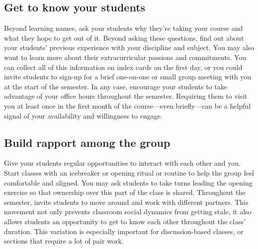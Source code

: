 \subsection{Get to know your students}
\label{sec:get-know-your}

Beyond learning names, ask your students why they’re taking your course and what they hope to get out of it. Beyond asking these questions, find out about your students’ previous experience with your discipline and subject. You may also want to learn more about their extracurricular passions and commitments. You can collect all of this information on index cards on the first day, or you could invite students to sign-up for a brief one-on-one or small group meeting with you at the start of the semester. In any case, encourage your students to take advantage of your office hours throughout the semester. Requiring them to visit you at least once in the first month of the course—even briefly—can be a helpful signal of your availability and willingness to engage.

\subsection{Build rapport among the group}
\label{sec:build-rapport-among}

Give your students regular opportunities to interact with each other and you. Start classes with an icebreaker or opening ritual or routine to help the group feel comfortable and aligned. You may ask students to take turns leading the opening exercise so that ownership over this part of the class is shared. Throughout the semester, invite students to move around and work with different partners. This movement not only prevents classroom social dynamics from getting stale, it also allows students an opportunity to get to know each other throughout the class’ duration. This variation is especially important for discussion-based classes, or sections that require a lot of pair work.


